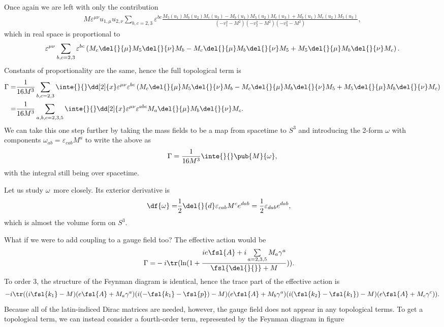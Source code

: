 Once again we are left with only the contribution
\begin{align*}
	M\varepsilon^{\mu\nu}u_{1, \mu}u_{2, \nu}\sum\limits_{b, c = 2, 3}\varepsilon^{bc}\frac{M_{5}(u_{1})M_{b}(u_{2})M_{c}(u_{3}) - M_{b}(u_{1})M_{5}(u_{2})M_{c}(u_{3}) + M_{b}(u_{1})M_{c}(u_{2})M_{5}(u_{3})}{(-v_{1}^{2} - M^{2})(-v_{2}^{2} - M^{2})(-v_{3}^{2} - M^{2})},
\end{align*}
which in real space is proportional to
\begin{align*}
	\varepsilon^{\mu\nu}\sum\limits_{b, c = 2, 3}\varepsilon^{bc}\left(M_{c}\del{}{\mu}M_{5}\del{}{\nu}M_{b} - M_{c}\del{}{\mu}M_{b}\del{}{\nu}M_{5} + M_{5}\del{}{\mu}M_{b}\del{}{\nu}M_{c}\right).
\end{align*}
Constants of proportionality are the same, hence the full topological term is
\begin{align*}
	\Gamma =& \frac{1}{16M^{3}}\sum\limits_{b, c = 2, 3}\inte{}{}\dd[2]{x}\varepsilon^{\mu\nu}\varepsilon^{bc}\left(M_{c}\del{}{\mu}M_{5}\del{}{\nu}M_{b} - M_{c}\del{}{\mu}M_{b}\del{}{\nu}M_{5} + M_{5}\del{}{\mu}M_{b}\del{}{\nu}M_{c}\right) \\
	       =& \frac{1}{16M^{3}}\sum\limits_{a, b, c = 2, 3, 5}\inte{}{}\dd[2]{x}\varepsilon^{\mu\nu}\varepsilon^{abc}M_{a}\del{}{\mu}M_{b}\del{}{\nu}M_{c}.
\end{align*}
We can take this one step further by taking the mass fields to be a map from spacetime to $S^{3}$ and introducing the 2-form $\omega$ with components $\omega_{ab} = \varepsilon_{cab}M^{a}$ to write the above as
\begin{align*}
	\Gamma = \frac{1}{16M^{3}}\inte{}{}\pub{M}{\omega},
\end{align*}
with the integral still being over spacetime.

Let us study $\omega$ more closely. Its exterior derivative is
\begin{align*}
	\df{\omega} =& \frac{1}{2}\del{}{d}\varepsilon_{cab}M^{c}e^{dab} = \frac{1}{2}\varepsilon_{dab}e^{dab},
\end{align*}
which is almost the volume form on $S^{3}$.

What if we were to add coupling to a gauge field too? The effective action would be
\begin{align*}
	\Gamma =& -i\tr(\ln(1 + \frac{ie\fsl{A} + i\sum\limits_{a = 2, 3, 5}M_{a}\gamma^{a}}{\fsl{\del{}{}} + M})).
\end{align*}
To order $3$, the structure of the Feynman diagram is identical, hence the trace part of the effective action is
\begin{align*}
	-i\tr((i\fsl{k_{1}} - M)(e\fsl{A} + M_{a}\gamma^{a})(i(-\fsl{k_{1}} - \fsl{p}) - M)(e\fsl{A} + M_{b}\gamma^{a})(i(\fsl{k_{2}} - \fsl{k_{1}}) - M)(e\fsl{A} + M_{c}\gamma^{c})).
\end{align*}
Because all of the latin-indiced Dirac matrices are needed, however, the gauge field does not appear in any topological terms. To get a topological term, we can instead consider a fourth-order term, represented by the Feynman diagram in figure 

